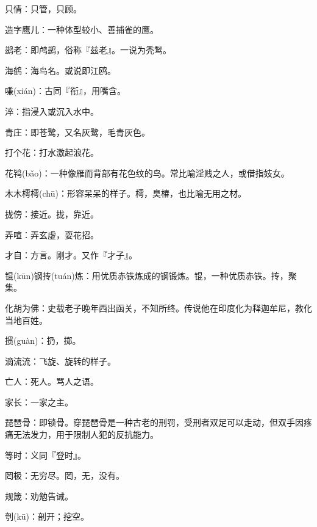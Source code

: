 \startbuffer[266]
只情：只管，只顾。
\stopbuffer


\startbuffer[267]
造字鹰儿：一种体型较小、善捕雀的鹰。
\stopbuffer


\startbuffer[268]
鹚老：即鸬鹚，俗称『兹老』。一说为秃鹙。
\stopbuffer


\startbuffer[269]
海鹤：海鸟名。或说即江鸥。
\stopbuffer


\startbuffer[270]
嗛(xián)：古同『衔』，用嘴含。
\stopbuffer


\startbuffer[271]
淬：指浸入或沉入水中。
\stopbuffer


\startbuffer[272]
青庄：即苍鹭，又名灰鹭，毛青灰色。
\stopbuffer


\startbuffer[273]
打个花：打水激起浪花。
\stopbuffer


\startbuffer[274]
花鸨(bǎo)：一种像雁而背部有花色纹的鸟。常比喻淫贱之人，或借指妓女。
\stopbuffer


\startbuffer[275]
木木樗樗(chū)：形容呆呆的样子。樗，臭椿，也比喻无用之材。
\stopbuffer


\startbuffer[276]
拢傍：接近。拢，靠近。
\stopbuffer


\startbuffer[277]
弄喧：弄玄虚，耍花招。
\stopbuffer


\startbuffer[278]
才自：方言。刚才。又作『才子』。
\stopbuffer


\startbuffer[279]
锟(kūn)钢抟(tuán)炼：用优质赤铁炼成的钢锻炼。锟，一种优质赤铁。抟，聚集。
\stopbuffer


\startbuffer[280]
化胡为佛：史载老子晚年西出函关，不知所终。传说他在印度化为释迦牟尼，教化当地百姓。
\stopbuffer


\startbuffer[281]
掼(guàn)：扔，掷。
\stopbuffer


\startbuffer[282]
滴流流：飞旋、旋转的样子。
\stopbuffer


\startbuffer[283]
亡人：死人。骂人之语。
\stopbuffer


\startbuffer[284]
家长：一家之主。
\stopbuffer


\startbuffer[285]
琵琶骨：即锁骨。穿琵琶骨是一种古老的刑罚，受刑者双足可以走动，但双手因疼痛无法发力，用于限制人犯的反抗能力。
\stopbuffer


\startbuffer[286]
等时：义同『登时』。
\stopbuffer


\startbuffer[287]
罔极：无穷尽。罔，无，没有。
\stopbuffer


\startbuffer[288]
规箴：劝勉告诫。
\stopbuffer


\startbuffer[289]
刳(kū)：剖开；挖空。
\stopbuffer


